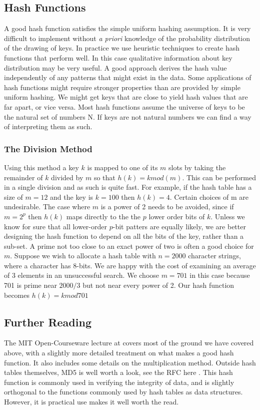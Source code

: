 \documentclass[10pt,a4paper]{article}
\begin{document}
\subsection{Hash Functions}
A good hash function satisfies the simple uniform hashing assumption. It is very difficult to implement without {\it a priori} knowledge of the probability distribution of the drawing of keys. In practice we use heuristic techniques to create hash functions that perform well. In this case qualitative information about key distribution may be very useful. A good approach derives the hash value independently of any patterns that might exist in the data. Some applications of hash functions might require stronger properties than are provided by simple uniform hashing. We might get keys that are close to yield hash values that are far apart, or vice versa. Most hash functions assume the universe of keys to be the natural set of numbers N. If keys are not natural numbers we can find a way of interpreting them as such. 
\subsubsection{The Division Method}
Using this method a key $k$ is mapped to one of its $m$ slots by taking the remainder of $k$ divided by $m$ so that $h(k) = k mod (m)$. This can be performed in a single division and as such is quite fast. For example, if the hash table has a size of $m=12$ and the key is $k=100$ then $h(k)=4$. Certain choices of m are undesirable. The case where $m$ is a power of 2 needs to be avoided, since if $m=2^p$ then $h(k)$ maps directly to the   the $p$ lower order bits of $k$. Unless we know for sure that all lower-order $p$-bit patters are equally likely, we are better designing the hash function to depend on all the bits of the key, rather than a sub-set.
\newline\newline
A prime not too close to an exact power of two is often a good choice for $m$. Suppose we wish to allocate a hash table with $n=2000$ character strings, where a character has 8-bits. We are happy with the cost of examining an average of 3 elements in an unsuccessful search. We choose $m=701$ in this case because 701 is prime near $2000/3$ but not near every power of 2. Our hash function becomes $h(k) = k mod 701$

\subsection{Further Reading}
The MIT Open-Courseware lecture at \cite{HASHTABLE} covers most of the ground we have covered above, with a slightly more detailed treatment on what makes a good hash function. It also includes some details on the multiplication method. Outside hash tables themselves, MD5 is well worth a look, see the RFC here \cite{MD5}. This hash function is commonly used in verifying the integrity of data, and is slightly orthogonal to the functions commonly used by hash tables as data structures. However, it is practical use makes it well worth the read. 
\end{document}
